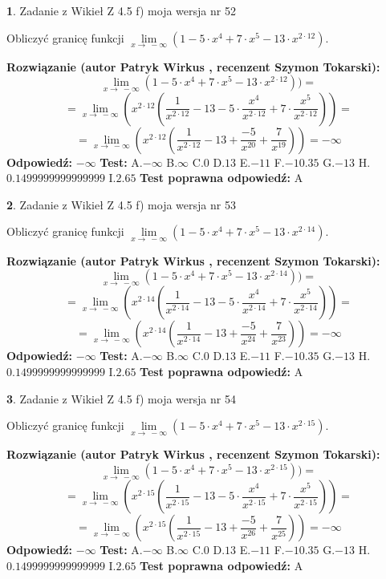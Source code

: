 \documentclass[12pt, a4paper]{article}
\theoremstyle{definition} %
\newtheorem{zad}{}
\newcommand{\zadStart}[1]{\begin{zad}#1\newline}
\newcommand{\zadStop}{\end{zad}}
\newcommand{\rozwStart}[2]{\noindent \textbf{Rozwiązanie (autor #1 , recenzent #2): }\newline}
\newcommand{\rozwStop}{\newline}
\newcommand{\odpStart}{\noindent \textbf{Odpowiedź:}\newline}
\newcommand{\odpStop}{\newline}
\newcommand{\testStart}{\noindent \textbf{Test:}\newline}
\newcommand{\testStop}{\newline}
\newcommand{\kluczStart}{\noindent \textbf{Test poprawna odpowiedź:}\newline}
\newcommand{\kluczStop}{\newline}
\begin{document}
\zadStart{Zadanie z Wikieł Z 4.5 f) moja wersja nr 52}


Obliczyć granicę funkcji  $\lim\limits_{x\to\ -\infty}(1 - 5 \cdot x^{4}+7 \cdot x^{5}- 13 \cdot x^{2\cdot12})$.
\zadStop
\rozwStart{Patryk Wirkus}{Szymon Tokarski}
$$\lim\limits_{x\to\ -\infty}(1 - 5 \cdot x^{4}+7 \cdot x^{5}- 13 \cdot x^{2\cdot12}))=$$
$$=\lim\limits_{x\to\ -\infty}(x^{2\cdot12}(\frac{1}{x^{2\cdot12}}-13 -5 \cdot \frac{x^{4}}{x^{2\cdot12}}+7 \cdot \frac{x^{5}}{x^{2\cdot12}}))=$$
$$=\lim\limits_{x\to\ -\infty}(x^{2\cdot12}(\frac{1}{x^{2\cdot12}}-13 + \frac{-5}{x^{20}}+ \frac{7}{x^{19}}))=-\infty$$
\rozwStop
\odpStart
$-\infty$
\odpStop
\testStart
A.$-\infty$ B.$\infty$ C.$0$ D.$13$ E.$-11$
F.$-10.35$ G.$-13$
H.$0.1499999999999999$
I.$2.65$
\testStop
\kluczStart
A
\kluczStop



\zadStart{Zadanie z Wikieł Z 4.5 f) moja wersja nr 53}


Obliczyć granicę funkcji  $\lim\limits_{x\to\ -\infty}(1 - 5 \cdot x^{4}+7 \cdot x^{5}- 13 \cdot x^{2\cdot14})$.
\zadStop
\rozwStart{Patryk Wirkus}{Szymon Tokarski}
$$\lim\limits_{x\to\ -\infty}(1 - 5 \cdot x^{4}+7 \cdot x^{5}- 13 \cdot x^{2\cdot14}))=$$
$$=\lim\limits_{x\to\ -\infty}(x^{2\cdot14}(\frac{1}{x^{2\cdot14}}-13 -5 \cdot \frac{x^{4}}{x^{2\cdot14}}+7 \cdot \frac{x^{5}}{x^{2\cdot14}}))=$$
$$=\lim\limits_{x\to\ -\infty}(x^{2\cdot14}(\frac{1}{x^{2\cdot14}}-13 + \frac{-5}{x^{24}}+ \frac{7}{x^{23}}))=-\infty$$
\rozwStop
\odpStart
$-\infty$
\odpStop
\testStart
A.$-\infty$ B.$\infty$ C.$0$ D.$13$ E.$-11$
F.$-10.35$ G.$-13$
H.$0.1499999999999999$
I.$2.65$
\testStop
\kluczStart
A
\kluczStop



\zadStart{Zadanie z Wikieł Z 4.5 f) moja wersja nr 54}


Obliczyć granicę funkcji  $\lim\limits_{x\to\ -\infty}(1 - 5 \cdot x^{4}+7 \cdot x^{5}- 13 \cdot x^{2\cdot15})$.
\zadStop
\rozwStart{Patryk Wirkus}{Szymon Tokarski}
$$\lim\limits_{x\to\ -\infty}(1 - 5 \cdot x^{4}+7 \cdot x^{5}- 13 \cdot x^{2\cdot15}))=$$
$$=\lim\limits_{x\to\ -\infty}(x^{2\cdot15}(\frac{1}{x^{2\cdot15}}-13 -5 \cdot \frac{x^{4}}{x^{2\cdot15}}+7 \cdot \frac{x^{5}}{x^{2\cdot15}}))=$$
$$=\lim\limits_{x\to\ -\infty}(x^{2\cdot15}(\frac{1}{x^{2\cdot15}}-13 + \frac{-5}{x^{26}}+ \frac{7}{x^{25}}))=-\infty$$
\rozwStop
\odpStart
$-\infty$
\odpStop
\testStart
A.$-\infty$ B.$\infty$ C.$0$ D.$13$ E.$-11$
F.$-10.35$ G.$-13$
H.$0.1499999999999999$
I.$2.65$
\testStop
\kluczStart
A
\kluczStop
\end{document}
